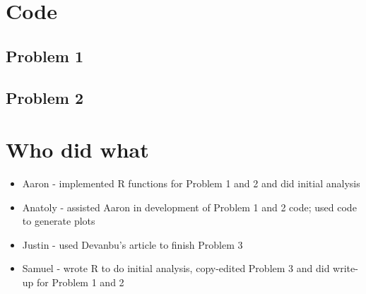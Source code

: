 \documentclass{article}
\begin{document}
\appendix
\section{Code}
\subsection{Problem 1}

\subsection{Problem 2}


\section{Who did what}
\begin{itemize}
	\item Aaron - implemented R functions for Problem 1 and 2 and did initial analysis
	\item Anatoly - assisted Aaron in development of Problem 1 and 2 code; used code to generate plots
	\item Justin - used Devanbu's article to finish Problem 3
	\item Samuel - wrote R to do initial analysis, copy-edited Problem 3 and did write-up for Problem 1 and 2
\end{itemize}
\end{document}
